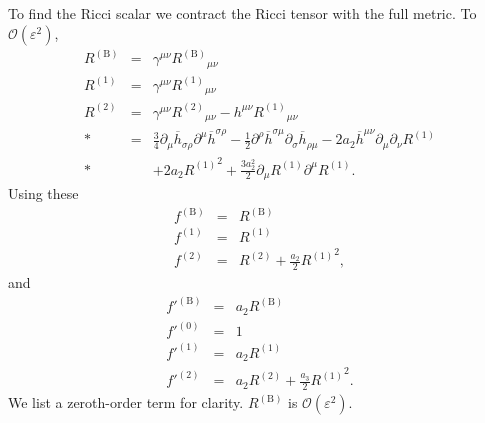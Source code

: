 \documentclass[aps,prd,amsfonts,amssymb,amsmath,nofootinbib,reprint,showpacs]{revtex4-1}
\newcommand{\recip}[1]{\ensuremath{\frac{1}{#1}}}
\newcommand{\order}[1]{\ensuremath{\mathcal{O}({#1})}}
\begin{document}
To find the Ricci scalar we contract the Ricci tensor with the full metric. To $\order{\varepsilon^2}$,
\begin{eqnarray}
R^{(\text{B})} & = & \gamma^{\mu\nu} {R^{(\text{B})}}_{\mu\nu} \\
R^{(1)} & = & \gamma^{\mu\nu} {R^{(1)}}_{\mu\nu} \\
R^{(2)} & = & \gamma^{\mu\nu} {R^{(2)}}_{\mu\nu} - h^{\mu\nu} {R^{(1)}}_{\mu\nu} \nonumber \\*
 & = & \frac{3}{4}\partial_\mu\overline{h}_{\sigma\rho}\partial^\mu\overline{h}^{\sigma\rho} - \recip{2} \partial^\rho\overline{h}^{\sigma\mu}\partial_\sigma\overline{h}_{\rho\mu} - 2a_2 \overline{h}^{\mu\nu}\partial_\mu\partial_\nu R^{(1)} \nonumber \\*
 & & + 2 a_2 {R^{(1)}}^2 + \frac{3a_2^2}{2}\partial_\mu R^{(1)} \partial^\mu R^{(1)}.
\end{eqnarray}
Using these
\begin{eqnarray}
f^{(\text{B})} & = & R^{(\text{B})} \\
f^{(1)} & = & R^{(1)} \\
f^{(2)} & = & R^{(2)} + \frac{a_2}{2}{R^{(1)}}^2,
\end{eqnarray}
and
\begin{eqnarray}
f'^{(\text{B})} & = & a_2 R^{(\text{B})} \\
f'^{(0)} & = & 1 \\
f'^{(1)} & = & a_2 R^{(1)} \\
f'^{(2)} & = & a_2 R^{(2)} + \frac{a_3}{2}{R^{(1)}}^2.
\end{eqnarray}
We list a zeroth-order term for clarity. $R^{(\text{B})}$ is $\order{\varepsilon^2}$.
\end{document}
